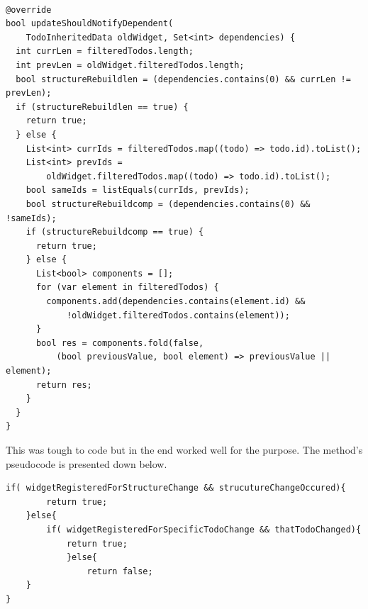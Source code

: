 \begin{code}
\begin{verbatim}

@override
bool updateShouldNotifyDependent(
    TodoInheritedData oldWidget, Set<int> dependencies) {
  int currLen = filteredTodos.length;
  int prevLen = oldWidget.filteredTodos.length;
  bool structureRebuildlen = (dependencies.contains(0) && currLen != prevLen);
  if (structureRebuildlen == true) {
    return true;
  } else {
    List<int> currIds = filteredTodos.map((todo) => todo.id).toList();
    List<int> prevIds =
        oldWidget.filteredTodos.map((todo) => todo.id).toList();
    bool sameIds = listEquals(currIds, prevIds);
    bool structureRebuildcomp = (dependencies.contains(0) && !sameIds);
    if (structureRebuildcomp == true) {
      return true;
    } else {
      List<bool> components = [];
      for (var element in filteredTodos) {
        components.add(dependencies.contains(element.id) &&
            !oldWidget.filteredTodos.contains(element));
      }
      bool res = components.fold(false,
          (bool previousValue, bool element) => previousValue || element);
      return res;
    }
  }
}
\end{verbatim}
\end{code}
This was tough to code but in the end worked well for the purpose. The method's pseudocode is presented down below. 
\begin{code}
\begin{verbatim}
if( widgetRegisteredForStructureChange && strucutureChangeOccured){
        return true;
    }else{
        if( widgetRegisteredForSpecificTodoChange && thatTodoChanged){
            return true;
            }else{
                return false;
    }
}
\end{verbatim}
\end{code}

